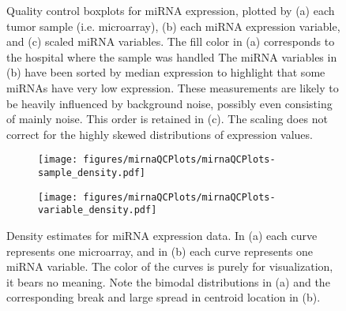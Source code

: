 \begin{figure}
	\centering
	\begin{subfigure}{1\textwidth}
		\centering
	\end{subfigure}
	\begin{subfigure}{1\textwidth}
		\centering
	\end{subfigure}
	\begin{subfigure}{1\textwidth}
		\centering
	\end{subfigure}

	\caption{Quality control boxplots for miRNA expression, plotted by
	(a) each tumor sample (i.e. microarray),
	(b) each miRNA expression variable, 
	and (c) scaled miRNA variables.
	The fill color in (a) corresponds to the hospital where the sample was handled
	The miRNA variables in (b) have been sorted by median expression to highlight that
	some miRNAs have very low expression. These measurements are likely to
	be heavily influenced by background noise, possibly even consisting of
	mainly noise. This order is retained in (c). The scaling does not
	correct for the highly skewed distributions of expression values.}
	\label{fig:qc-mirna-boxplot}
\end{figure}


\begin{figure}[!h]
	\centering
	\begin{subfigure}{.45\textwidth}
		\centering
		\texttt{[image: figures/mirnaQCPlots/mirnaQCPlots-sample\_density.pdf]}
	\end{subfigure}%
	\begin{subfigure}{.45\textwidth}
		\centering
		\texttt{[image: figures/mirnaQCPlots/mirnaQCPlots-variable\_density.pdf]}
	\end{subfigure}

	\caption{Density estimates for miRNA expression data. In (a) each curve represents one microarray,
	and in (b) each curve represents one miRNA variable. The color of the curves is purely for visualization,
	it bears no meaning. Note the bimodal distributions in (a) and the corresponding break
	and large spread in centroid location in (b).}
	\label{fig:qc-mirna-density}
\end{figure}
